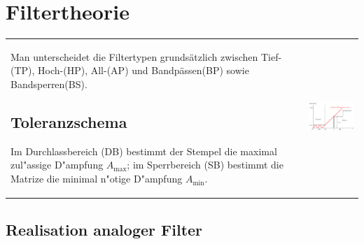 \section{Filtertheorie }
\begin{tabular}{ll}
\parbox{12cm}{
	Man unterscheidet die Filtertypen grundsätzlich zwischen
	Tief-(TP), Hoch-(HP), All-(AP) und Bandpässen(BP) sowie Bandsperren(BS).
	
	\subsection{Toleranzschema }
  \label{toleranzschema}
	Im Durchlassbereich (DB) bestimmt der Stempel die maximal zul"assige D"ampfung
	$A_{\max}$; im Sperrbereich (SB) bestimmt die Matrize die minimal n"otige
	D"ampfung $A_{\min}$.}
	
& \parbox{6cm}{
	\includegraphics[width=6cm]{./images/filter-toleranzschema.png}}
\end{tabular}

\subsection{Realisation analoger Filter}
